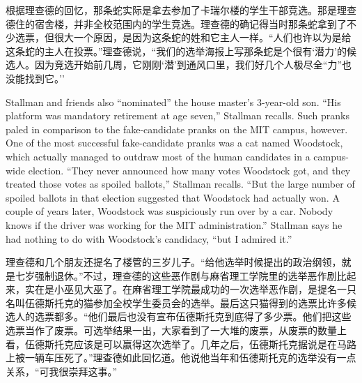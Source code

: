 \ifdefined\chs
根据理查德的回忆，那条蛇实际是拿去参加了卡瑞尔楼的学生干部竞选。那是理查德住的宿舍楼，并非全校范围内的学生竞选。理查德的确记得当时那条蛇拿到了不少选票，但很大一个原因，是因为这条蛇的姓和它主人一样。``人们也许以为是给这条蛇的主人在投票。''理查德说，``我们的选举海报上写那条蛇是个很有`潜力'的候选人。因为竞选开始前几周，它刚刚`潜'到通风口里，我们好几个人极尽全``力''也没能找到它。''
\fi

\ifdefined\eng
Stallman and friends also ``nominated'' the house master's 3-year-old son. ``His platform was mandatory retirement at age seven,'' Stallman recalls. Such pranks paled in comparison to the fake-candidate pranks on the MIT campus, however. One of the most successful fake-candidate pranks was a cat named Woodstock, which actually managed to outdraw most of the human candidates in a campus-wide election. ``They never announced how many votes Woodstock got, and they treated those votes as spoiled ballots,'' Stallman recalls. ``But the large number of spoiled ballots in that election suggested that Woodstock had actually won. A couple of years later, Woodstock was suspiciously run over by a car. Nobody knows if the driver was working for the MIT administration.'' Stallman says he had nothing to do with Woodstock's candidacy, ``but I admired it.''
\fi

\ifdefined\chs
理查德和几个朋友还提名了楼管的三岁儿子。``给他选举时候提出的政治纲领，就是七岁强制退休。''不过，理查德的这些恶作剧与麻省理工学院里的选举恶作剧比起来，实在是小巫见大巫了。在麻省理工学院最成功的一次选举恶作剧，是提名一只名叫伍德斯托克的猫参加全校学生委员会的选举。最后这只猫得到的选票比许多候选人的选票都多。``他们最后也没有宣布伍德斯托克到底得了多少票。他们把这些选票当作了废票。可选举结果一出，大家看到了一大堆的废票，从废票的数量上看，伍德斯托克应该是可以赢得这次选举了。几年之后，伍德斯托克据说是在马路上被一辆车压死了。''理查德如此回忆道。他说他当年和伍德斯托克的选举没有一点关系，``可我很崇拜这事。''
\fi

